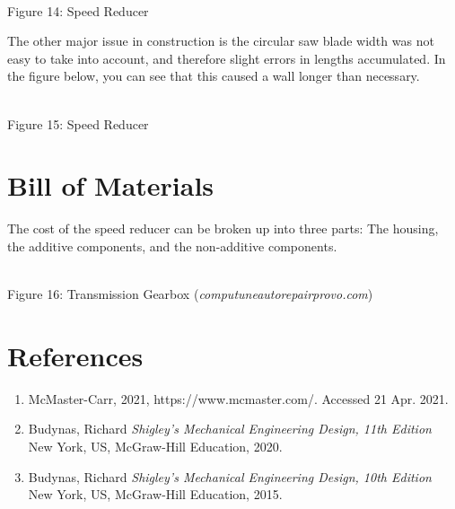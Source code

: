 \documentclass{article}
\begin{document}
\begin{center}
\\
\scriptsize{
Figure 14: Speed Reducer 
}
\end{center}

The other major issue in construction is the circular saw blade width was not easy to take into account, and therefore slight errors in lengths accumulated. In the figure below, you can see that this caused a wall longer than necessary.

\begin{center}
\\
\scriptsize{
Figure 15: Speed Reducer 
}
\end{center}


\section{Bill of Materials}
The cost of the speed reducer can be broken up into three parts: The housing, the additive components, and the non-additive components.

\begin{center}
\\
\scriptsize{
Figure 16: Transmission Gearbox (\textit{computuneautorepairprovo.com})
}
\end{center}



\section{References}

\begin{enumerate}

\item McMaster-Carr, 2021, https://www.mcmaster.com/. Accessed 21 Apr. 2021.

\item Budynas, Richard \textit{Shigley's Mechanical Engineering Design, 11th Edition} New York, US, McGraw-Hill Education, 2020.

\item Budynas, Richard \textit{Shigley's Mechanical Engineering Design, 10th Edition} New York, US, McGraw-Hill Education, 2015.

\end{enumerate}
\end{document}
